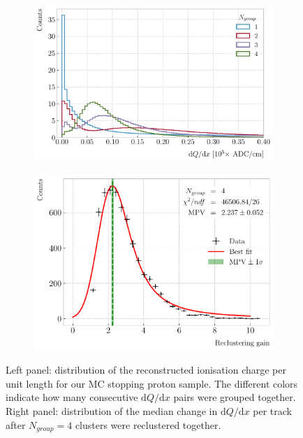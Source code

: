 \begin{figure}[t]
	\begin{subfigure}{0.5\textwidth}
		\centering
		\includegraphics[width=.90\linewidth]{Images/GArSoft_PID/dEdx/reco_dQdx_groups.pdf}
	\end{subfigure}
	\begin{subfigure}{0.5\textwidth}
		\centering
		\includegraphics[width=.90\linewidth]{Images/GArSoft_PID/dEdx/dQdx_recluster_gain.pdf}
	\end{subfigure}
	\caption[Distribution of the reconstructed ionisation charge per unit length for different reclustering values, and distribution of the median change in $\mathrm{d}Q/\mathrm{d}x$ per track for the $N_{group}=4$ reclustering.]{Left panel: distribution of the reconstructed ionisation charge per unit length for our MC stopping proton sample. The different colors indicate how many consecutive $\mathrm{d}Q/\mathrm{d}x$ pairs were grouped together. Right panel: distribution of the median change in $\mathrm{d}Q/\mathrm{d}x$ per track after $N_{group}=4$ clusters were reclustered together.}
	\label{fig:reco_dQ_groups}
\end{figure}

